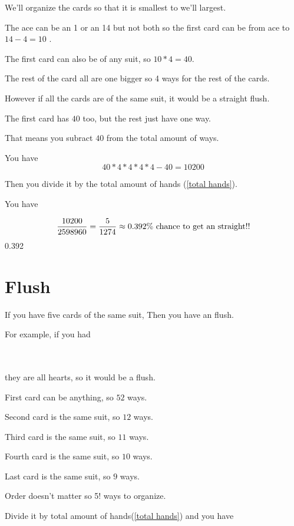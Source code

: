 \documentclass[12pt]{article}
\newcommand\redcard[2]{%
  \begingroup\fboxsep=0pt\relax
  \fbox{\color{red}\tabbedCenterstack{%
  \scriptsize$#2$ && \\&\makebox[10pt]{#1}&\\&&\rotatebox[origin=c]{180}{\scriptsize$#2$}}}%
  \endgroup}
\begin{document}
We'll organize the cards so that it is smallest to we'll largest.

The ace can be an 1 or an 14 but not both so the first card can be from ace to $ 14 - 4 = 10$ .

The first card can also be of any suit, so $ 10 * 4 = 40 $.

The rest of the card all are one bigger so 4 ways for the rest of the cards.

However if all the cards are of the same suit, it would be a straight flush.

The first card has $ 40 $ too, but the rest just have one way.

That means you subract $  40 $ from the total amount of ways.

You have
\begin{equation}
  40 * 4 * 4 * 4 * 4 - 40 = 10200
\end{equation}

Then you divide it by the total amount of hands (\ref{total hands}).

You have

\begin{equation}
  {10200 \over 2598960} = {5 \over 1274} \approx 0.392\% \hbox{ chance to get an straight!!}
\end{equation}
0.392
\section{Flush}

If you have five cards of the same suit, Then you have an flush.

For example, if you had

\redcard{5}{\heartsuit}
\redcard{7}{\heartsuit}
\redcard{9}{\heartsuit}
\redcard{J}{\heartsuit}
\redcard{A}{\heartsuit}
\\\\

they are all hearts, so it would be a flush.

First card can be anything, so $52$ ways.

Second card is the same suit, so $12$ ways.

Third card is the same suit, so $11$ ways.

Fourth card is the same suit, so $10$ ways.

Last card is the same suit, so $9$ ways.

Order doesn't matter so 5! ways to organize.

Divide it by total amount of hands(\ref{total hands}) and you have
\end{document}
